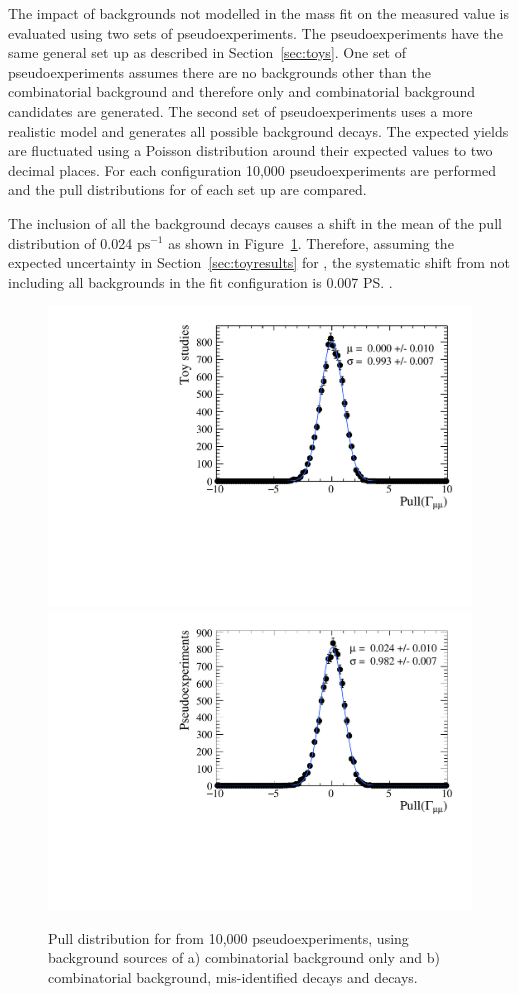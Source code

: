 The impact of backgrounds not modelled in the mass fit on the measured \tmumu value is evaluated using two sets of pseudoexperiments. The pseudoexperiments have the same general set up as described in Section~\ref{sec:toys}. One set of pseudoexperiments assumes there are no backgrounds other than the combinatorial background and therefore only \bsmumu and combinatorial background candidates are generated. The second set of pseudoexperiments uses a more realistic model and generates all possible background decays. The expected yields are fluctuated using a Poisson distribution around their expected values to two decimal places. For each configuration 10,000 pseudoexperiments are performed and the pull distributions for \Gmumu of each set up are compared. %

The inclusion of all the background decays causes a shift in the mean of the \Gmumu pull distribution of 0.024 $\mathrm{ps}^{-1}$ as shown in Figure~\ref{fig:bkdcontam}. Therefore, assuming the expected uncertainty in Section~\ref{sec:toyresults} for \tmumu, the systematic shift from not including all backgrounds in the fit configuration is 0.007 \ps.%

\begin{figure}[tbp]
    \centering
        \includegraphics[width=0.49 \textwidth]{./Figs/LifetimeSystematics/Gamma_pull_mass_pdf_Run1.pdf}
        \includegraphics[width=0.49 \textwidth]{./Figs/LifetimeSystematics/5320_all_bkgnds_gamma_pull_CKM.pdf}
    \caption{Pull distribution for \Gmumu from 10,000 pseudoexperiments, using background sources of a) combinatorial background only and b) combinatorial background, mis-identified decays and \bdmumu decays.}
    \label{fig:bkdcontam}
\end{figure}

